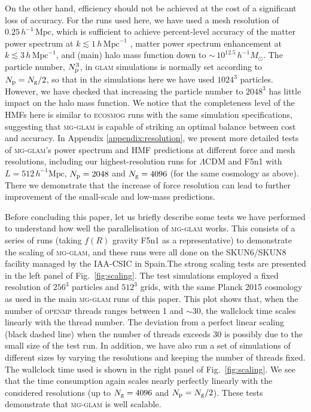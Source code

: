 On the other hand, efficiency should not be achieved at the cost of a significant loss of accuracy. For the runs used here, we have used a mesh resolution of $0.25 \, h^{-1} \, \mathrm{Mpc}$, which is sufficient to achieve percent-level accuracy of the matter power spectrum at $k\lesssim 1 \, h \, \mathrm{Mpc}^{-1}$ \cite{Klypin:2017iwu}, matter power spectrum enhancement at $k \lesssim 3 \, h \, \mathrm{Mpc}^{-1}$, and (main) halo mass function down to $\sim \, 10^{12.5} \, h^{-1}M_\odot$. The particle number, $N_{\rm p}^3$, in \textsc{glam} simulations is normally set according to $N_{\rm p}=N_{\rm g}/2$, so that in the simulations here we have used $1024^3$ particles. However, we have checked that increasing the particle number to $2048^3$ has little impact on the halo mass function. We notice that the completeness level of the HMFs here is similar to \textsc{ecosmog} runs with the same simulation specifications, suggesting that \textsc{mg-glam} is capable of striking an optimal balance between cost and accuracy. In Appendix \ref{appendix:resolution}, we present more detailed tests of \textsc{mg-glam}'s power spectrum and HMF predictions at different force and mesh resolutions, including our highest-resolution runs for $\Lambda$CDM and F5n1 with $L = 512 \, h^{-1}\mathrm{Mpc}$, $N_{\rm p}=2048$ and $N_{\rm g}=4096$ (for the same cosmology as above). There we demonstrate that the increase of force resolution can lead to further improvement of the small-scale and low-mass predictions.


Before concluding this paper, let us briefly describe some tests we have performed to understand how well the parallelisation of \textsc{mg-glam} works. This consists of a series of runs (taking $f(R)$ gravity F5n1 as a representative) to demonstrate the scaling of \textsc{mg-glam}, and these runs were all done on the SKUN6/SKUN8 facility managed by the IAA-CSIC in Spain.The strong scaling tests are presented in the left panel of Fig.~\ref{fig:scaling}. The test simulations employed a fixed resolution of $256^3$ particles and $512^3$ grids, with the same Planck 2015 cosmology as used in the main \textsc{mg-glam} runs of this paper. This plot shows that, when the number of \textsc{openmp} threads ranges between 1 and $\sim 30$, the wallclock time scales linearly with the thread number. The deviation from a perfect linear scaling (black dashed line) when the number of threads exceeds $30$ is possibly due to the small size of the test run. In addition, we have also run a set of simulations of different sizes by varying the resolutions and keeping the number of threads fixed. The wallclock time used is shown in the right panel of Fig.~\ref{fig:scaling}. We see that the time consumption again scales nearly perfectly linearly with the considered resolutions (up to $N_{\rm g} = 4096$ and $N_{\rm p} = N_{\rm g}/2$). These tests demonstrate that \textsc{mg-glam} is well scalable.



